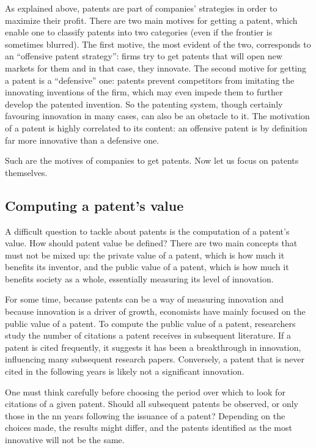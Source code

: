 \documentclass[12pt]{article}
\begin{document}
As explained above, patents are part of companies' strategies in order to maximize their profit. There are two main motives for getting a patent, which enable one to classify patents into two categories (even if the frontier is sometimes blurred). The first motive, the most evident of the two, corresponds to an “offensive patent strategy”: firms try to get patents that will open new markets for them and in that case, they innovate. The second motive for getting a patent is a “defensive” one: patents prevent competitors from imitating the innovating inventions of the firm, which may even impede them to further develop the patented invention. So the patenting system, though certainly favouring innovation in many cases, can also be an obstacle to it. The motivation of a patent is highly correlated to its content: an offensive patent is by definition far more innovative than a defensive one. 

Such are the motives of companies to get patents. Now let us focus on patents themselves.

\subsection{Computing a patent's value}
A difficult question to tackle about patents is the computation of a patent’s value. How should patent value be defined? There are two main concepts that must not be mixed up: the private value of a patent, which is how much it benefits its inventor, and the public value of a patent, which is how much it benefits society as a whole, essentially measuring its level of innovation.

For some time, because patents can be a way of measuring innovation and because innovation is a driver of growth, economists have mainly focused on the public value of a patent. To compute the public value of a patent, researchers study the number of citations a patent receives in subsequent literature. If a patent is cited frequently, it suggests it has been a breakthrough in innovation, influencing many subsequent research papers. Conversely, a patent that is never cited in the following years is likely not a significant innovation.

One must think carefully before choosing the period over which to look for citations of a given patent. Should all subsequent patents be observed, or only those in the nn years following the issuance of a patent? Depending on the choices made, the results might differ, and the patents identified as the most innovative will not be the same.
\end{document}

